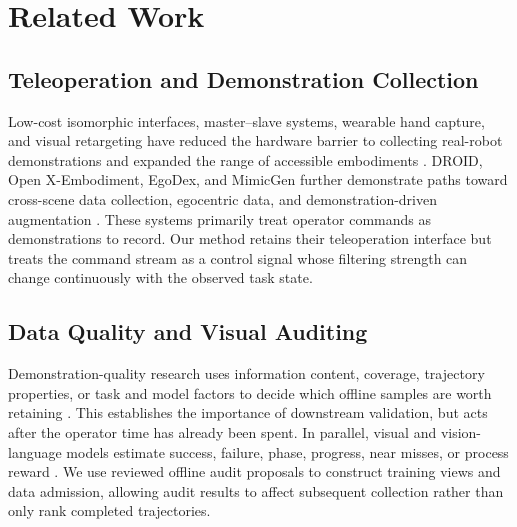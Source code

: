 \section{Related Work}
\label{sec:related_work}

\subsection{Teleoperation and Demonstration Collection}
Low-cost isomorphic interfaces, master--slave systems, wearable hand capture,
and visual retargeting have reduced the hardware barrier to collecting
real-robot demonstrations and expanded the range of accessible embodiments
\citep{wuGELLOGeneralLowCost2024,zhaoLearningFineGrainedBimanual2023,fuMobileALOHALearning2024,chiUniversalManipulationInterface2024,wangDexCapScalablePortable2024,qinAnyTeleopGeneralVisionBased2024,xuDexUMIUsingHuman2025}.
DROID, Open X-Embodiment, EgoDex, and MimicGen further demonstrate paths toward
cross-scene data collection, egocentric data, and demonstration-driven
augmentation
\citep{khazatskyDROIDLargeScaleInTheWild2024,collaborationOpenXEmbodimentRobotic2025,hoqueEGODEXLEARNINGDEXTEROUSMANIPULATION2026,mandlekarMimicGenDataGeneration2023}.
These systems primarily treat operator commands as demonstrations to record.
Our method retains their teleoperation interface but treats the command stream
as a control signal whose filtering strength can change continuously with the
observed task state.

\subsection{Data Quality and Visual Auditing}
Demonstration-quality research uses information content, coverage, trajectory
properties, or task and model factors to decide which offline samples are worth
retaining
\citep{hejnaRobotDataCuration2025,chiDiffusionPolicyVisuomotor2024,zhaoLearningFineGrainedBimanual2023}.
This establishes the importance of downstream validation, but acts after the
operator time has already been spent. In parallel, visual and vision-language
models estimate success, failure, phase, progress, near misses, or process
reward
\citep{duanAHAVisionLanguageModelDetecting2024,sermanetRoboVQAMultimodalLongHorizon2024,leeRoboRewardGeneralPurposeVisionLanguage2026,wuLargeRewardModels2026}.
We use reviewed offline audit proposals to construct training views and data
admission, allowing audit results to affect subsequent collection rather than
only rank completed trajectories.

